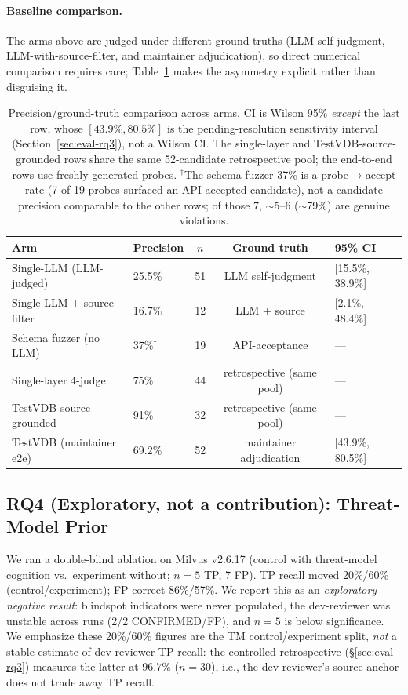 \documentclass[sigconf]{acmart}
\begin{document}
\paragraph{Baseline comparison.} The arms above are judged under different ground truths (LLM self-judgment, LLM-with-source-filter, and maintainer adjudication), so direct numerical comparison requires care; Table~\ref{tab:baselines} makes the asymmetry explicit rather than disguising it.

\begin{table}[t]
\caption{Precision/ground-truth comparison across arms. CI is Wilson 95\% \emph{except} the last row, whose $[43.9\%, 80.5\%]$ is the pending-resolution sensitivity interval (Section~\ref{sec:eval-rq3}), not a Wilson CI. The single-layer and TestVDB-source-grounded rows share the same 52-candidate retrospective pool; the end-to-end rows use freshly generated probes. $^{\dagger}$The schema-fuzzer 37\% is a probe$\to$accept rate (7 of 19 probes surfaced an API-accepted candidate), not a candidate precision comparable to the other rows; of those 7, $\sim$5--6 ($\sim$79\%) are genuine violations.}
\label{tab:baselines}
\small
\begin{tabular}{@{}llccl@{}}
\toprule
Arm & Precision & $n$ & Ground truth & 95\% CI \\
\midrule
Single-LLM (LLM-judged) & 25.5\% & 51 & LLM self-judgment & [15.5\%, 38.9\%] \\
Single-LLM + source filter & 16.7\% & 12 & LLM + source & [2.1\%, 48.4\%] \\
Schema fuzzer (no LLM) & 37\%$^{\dagger}$ & 19 & API-acceptance & --- \\
Single-layer 4-judge & 75\% & 44 & retrospective (same pool) & --- \\
TestVDB source-grounded & 91\% & 32 & retrospective (same pool) & --- \\
TestVDB (maintainer e2e) & 69.2\% & 52 & maintainer adjudication & [43.9\%, 80.5\%] \\
\bottomrule
\end{tabular}
\end{table}

\subsection{RQ4 (Exploratory, not a contribution): Threat-Model Prior}\label{sec:eval-tm}
We ran a double-blind ablation on Milvus v2.6.17 (control with threat-model cognition vs.\ experiment without; $n{=}5$ TP, 7 FP). TP recall moved 20\%/60\% (control/experiment); FP-correct 86\%/57\%. We report this as an \emph{exploratory negative result}: blindspot indicators were never populated, the dev-reviewer was unstable across runs (2/2 CONFIRMED/FP), and $n{=}5$ is below significance. We emphasize these 20\%/60\% figures are the TM control/experiment split, \emph{not} a stable estimate of dev-reviewer TP recall: the controlled retrospective (\S\ref{sec:eval-rq3}) measures the latter at $96.7\%$ ($n{=}30$), i.e., the dev-reviewer's source anchor does not trade away TP recall.
\end{document}
